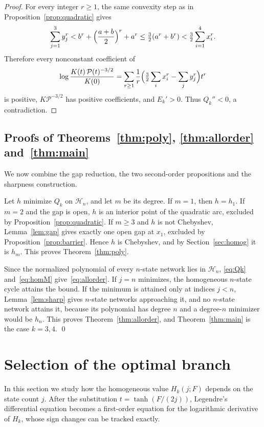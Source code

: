 \documentclass[11pt]{article}
\theoremstyle{remark}
\newcommand{\HH}{\mathcal H}
\begin{document}
\begin{proof}
For every integer $r\ge1$, the same convexity step as in
Proposition~\ref{prop:quadratic} gives
\[
\sum_{j=1}^3y_j^r<b^r+\Bigl(\frac{a+b}2\Bigr)^r+a^r
\le\tfrac32(a^r+b^r)<\tfrac32\sum_{i=1}^4x_i^r.
\]
Therefore every nonconstant coefficient of
\[
\log\frac{K(t)\,\mathcal P(t)^{-3/2}}{K(0)}=\sum_{r\ge1}\frac1r
\Bigl(\tfrac32\sum_ix_i^r-\sum_jy_j^r\Bigr)t^r
\]
is positive, $K\mathcal P^{-3/2}$ has positive coefficients, and $E_k'>0$.
Thus $Q_k''<0$, a contradiction.
\end{proof}

\subsection{Proofs of Theorems~\ref{thm:poly}, \ref{thm:allorder}
and~\ref{thm:main}}
We now combine the gap reduction, the two second-order propositions and the
sharpness construction.

Let $h$ minimize $Q_k$ on $\HH_n$, and let $m$ be its degree. If $m=1$, then
$h=h_1$. If $m=2$ and the gap is open, $h$ is an interior point of the
quadratic arc, excluded by Proposition~\ref{prop:quadratic}. If $m\ge3$ and
$h$ is not Chebyshev, Lemma~\ref{lem:gap} gives exactly one open gap at
$x_1$, excluded by Proposition~\ref{prop:barrier}. Hence $h$ is Chebyshev,
and by Section~\ref{sec:homog} it is $h_m$. This proves
Theorem~\ref{thm:poly}.

Since the normalized polynomial of every $n$-state network lies in $\HH_n$,
\eqref{eq:Qk} and~\eqref{eq:homM} give~\eqref{eq:allorder}. If $j=n$
minimizes, the homogeneous $n$-state cycle attains the bound. If the minimum
is attained only at indices $j<n$, Lemma~\ref{lem:sharp} gives $n$-state
networks approaching it, and no $n$-state network attains it, because its
polynomial has degree $n$ and a degree-$n$ minimizer would be $h_n$. This
proves Theorem~\ref{thm:allorder}, and Theorem~\ref{thm:main} is the case
$k=3,4$. \qed

\section{Selection of the optimal branch}\label{sec:selector}

In this section we study how the homogeneous value $H_k(j;F)$ depends on
the state count $j$. After the substitution $t=\tanh(F/(2j))$, Legendre's
differential equation becomes a first-order equation for the logarithmic
derivative of $H_k$, whose sign changes can be tracked exactly.
\end{document}
